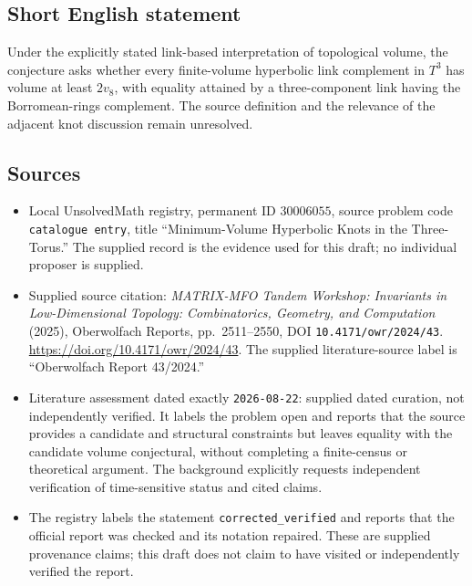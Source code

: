 \documentclass[11pt]{article}
\begin{document}
\subsection{Short English statement}
Under the explicitly stated link-based interpretation of topological volume, the conjecture asks whether every finite-volume hyperbolic link complement in \(T^3\) has volume at least \(2v_8\), with equality attained by a three-component link having the Borromean-rings complement. The source definition and the relevance of the adjacent knot discussion remain unresolved.
\subsection{Sources}
\begin{itemize}
\item Local UnsolvedMath registry, permanent ID \(30006055\), source problem code \texttt{catalogue entry}, title ``Minimum-Volume Hyperbolic Knots in the Three-Torus.'' The supplied record is the evidence used for this draft; no individual proposer is supplied.
\item Supplied source citation: \emph{MATRIX-MFO Tandem Workshop: Invariants in Low-Dimensional Topology: Combinatorics, Geometry, and Computation} (2025), Oberwolfach Reports, pp.\ 2511--2550, DOI \texttt{10.4171/owr/2024/43}. \url{https://doi.org/10.4171/owr/2024/43}. The supplied literature-source label is ``Oberwolfach Report 43/2024.''
\item Literature assessment dated exactly \texttt{2026-08-22}: supplied dated curation, not independently verified. It labels the problem open and reports that the source provides a candidate and structural constraints but leaves equality with the candidate volume conjectural, without completing a finite-census or theoretical argument. The background explicitly requests independent verification of time-sensitive status and cited claims.
\item The registry labels the statement \texttt{corrected\_verified} and reports that the official report was checked and its notation repaired. These are supplied provenance claims; this draft does not claim to have visited or independently verified the report.
\end{itemize}
\end{document}
